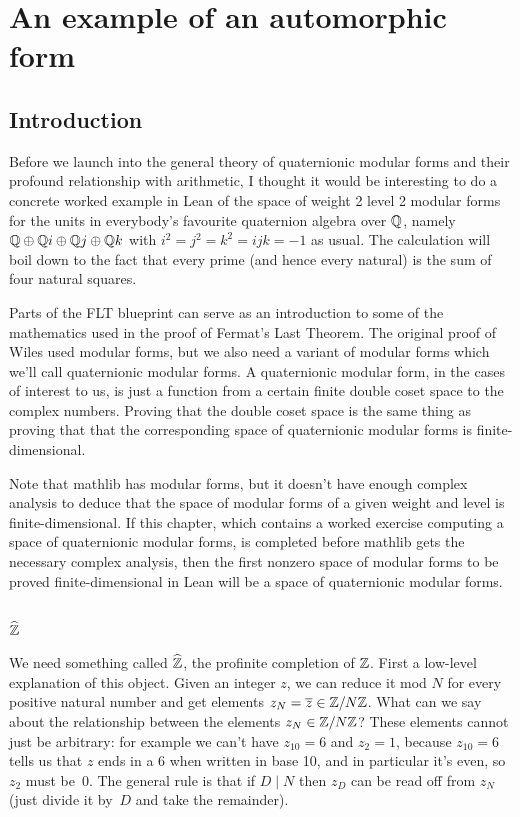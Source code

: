 \chapter{An example of an automorphic form}

\section{Introduction}

Before we launch into the general theory of quaternionic modular forms and their
profound relationship with arithmetic, I thought it would be interesting to do a 
concrete worked example in Lean of the space of weight 2 level 2
modular forms for the units in everybody's favourite quaternion algebra over $\mathbb{Q}$, namely
$\mathbb{Q}\oplus\mathbb{Q} i\oplus\mathbb{Q} j\oplus\mathbb{Q} k$ with $i^2=j^2=k^2=ijk=-1$ as usual. The calculation will
boil down to the fact that every prime (and hence every natural) is the sum of four
natural squares.

Parts of the FLT blueprint can serve as an introduction to some of the mathematics used in the proof of
Fermat's Last Theorem. The original proof of Wiles used modular forms, but we also need a
variant of modular forms which we'll call quaternionic modular forms. A quaternionic modular
form, in the cases of interest to us, is just a function from a certain finite double coset space to the complex numbers. Proving that the double coset space is the same thing as
proving that that the corresponding space of quaternionic modular forms is finite-dimensional.

Note that mathlib has modular forms, but it doesn't have enough complex analysis to deduce
that the space of modular forms of a given weight and level is finite-dimensional. If this
chapter, which contains a worked exercise computing a space of quaternionic modular forms, is completed
before mathlib gets the necessary complex analysis, then the first nonzero space of modular forms
to be proved finite-dimensional in Lean will be a space of quaternionic modular forms.


\section{$\widehat{\mathbb{Z}}$}

We need something called $\widehat{\mathbb{Z}}$, the profinite completion of $\mathbb{Z}$. First a low-level explanation
of this object. Given an integer $z$, we can reduce it mod $N$ for every positive natural
number and get elements $z_N=\overline{z}\in\mathbb{Z}/N\mathbb{Z}$. What can we say 
about the relationship between the elements $z_N\in\mathbb{Z}/N\mathbb{Z}$? These elements cannot just be
arbitrary: for example we can't have $z_{10}=6$ and $z_2=1$, because $z_{10}=6$ tells us that
$z$ ends in a 6 when written in base 10, and in particular it's even, so $z_2$ must be~0.
The general rule is that if $D\mid N$ then $z_D$ can be read off from $z_N$ (just divide it by~$D$
and take the remainder).

